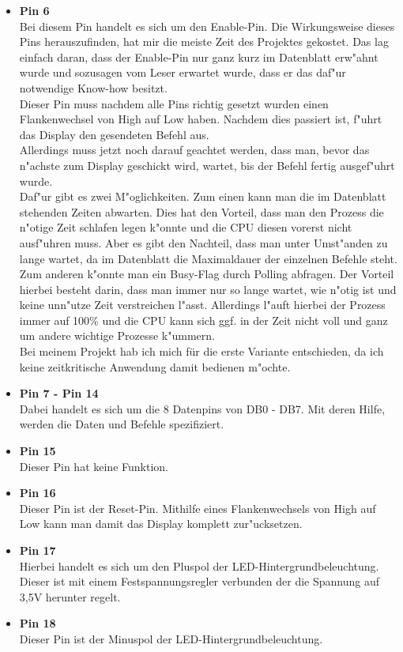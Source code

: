 \documentclass[a4paper]{scrreprt}
\begin{document}
\begin{itemize}
				\item \textbf{Pin 6} \\
				Bei diesem Pin handelt es sich um den Enable-Pin. Die Wirkungsweise 
				dieses Pins herauszufinden, hat mir die meiste Zeit des Projektes 
				gekostet. Das lag einfach daran, dass der Enable-Pin nur ganz kurz
				im Datenblatt erw"ahnt wurde und sozusagen vom Leser erwartet wurde,
				dass er das daf"ur notwendige Know-how besitzt. \\
				Dieser Pin muss nachdem alle Pins richtig gesetzt wurden einen Flankenwechsel
				von High auf Low haben. Nachdem dies passiert ist, f"uhrt das Display
				den gesendeten Befehl aus. \\
				Allerdings muss jetzt noch darauf geachtet werden, dass man, bevor das n"achste
				zum Display geschickt wird, wartet, bis der Befehl fertig ausgef"uhrt wurde.\\
				Daf"ur gibt es zwei M"oglichkeiten.
				Zum einen kann man die im Datenblatt stehenden Zeiten abwarten. Dies hat den 
				Vorteil, dass man den Prozess die n"otige Zeit schlafen legen k"onnte und die
				CPU diesen vorerst nicht ausf"uhren muss. Aber es gibt den Nachteil, dass man 
				unter Umst"anden zu lange wartet, da im Datenblatt die Maximaldauer 
				der einzelnen Befehle steht.
				Zum anderen k"onnte man ein Busy-Flag durch Polling abfragen. Der Vorteil hierbei
				besteht darin, dass man immer nur so lange wartet, wie n"otig ist und keine
				unn"utze Zeit verstreichen l"asst. Allerdings l"auft hierbei der Prozess immer 
				auf 100\% und die CPU kann sich ggf. in der Zeit nicht voll und ganz um andere 
				wichtige Prozesse k"ummern. \\
				Bei meinem Projekt hab ich mich für die erste Variante entschieden, 
				da ich keine zeitkritische Anwendung damit bedienen m"ochte.
				  
				\item \textbf{Pin 7 - Pin 14} \\
				Dabei handelt es sich um die 8 Datenpins von DB0 - DB7. Mit deren Hilfe, werden
				die Daten und Befehle spezifiziert.
				
				\item \textbf{Pin 15} \\
				Dieser Pin hat keine Funktion.
				
				\item \textbf{Pin 16} \\
				Dieser Pin ist der Reset-Pin. Mithilfe eines Flankenwechsels von High auf Low
				kann man damit das Display komplett zur"ucksetzen.
				
				\item \textbf{Pin 17} \\
				Hierbei handelt es sich um den Pluspol der LED-Hintergrundbeleuchtung. Dieser
				ist mit einem Festspannungsregler verbunden der die Spannung auf 3,5V 
				herunter regelt.
				
				\item \textbf{Pin 18} \\
				Dieser Pin ist der Minuspol der LED-Hintergrundbeleuchtung.
				 
			\end{itemize}
\end{document}
